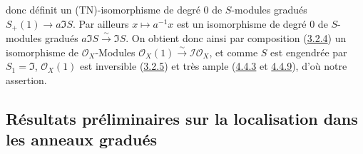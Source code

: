 donc définit un (TN)-isomorphisme de degré $0$ de $S$-modules gradués
$S_+(1)\to a\mathfrak{I}S$. Par ailleurs $x\mapsto a^{-1}x$ est un
isomorphisme de degré $0$ de $S$-modules gradués
$a\mathfrak{I}S\xrightarrow{\sim}\mathfrak{I}S$. On obtient donc ainsi par
composition (\hyperref[II.3.2.4-fr]{3.2.4}) un isomorphisme de
$\mathcal{O}_X$-Modules
$\mathcal{O}_X(1)\xrightarrow{\sim}\mathcal{I}\mathcal{O}_X$, et comme $S$
est engendrée par $S_1=\mathfrak{I}$, $\mathcal{O}_X(1)$ est inversible
(\hyperref[II.3.2.5-fr]{3.2.5}) et très ample
(\hyperref[II.4.4.3-fr]{4.4.3} et \hyperref[II.4.4.9-fr]{4.4.9}), d'où notre
assertion.

\subsection{Résultats préliminaires sur la localisation dans les anneaux gradués}
\label{subsection:II.8.2-fr}

